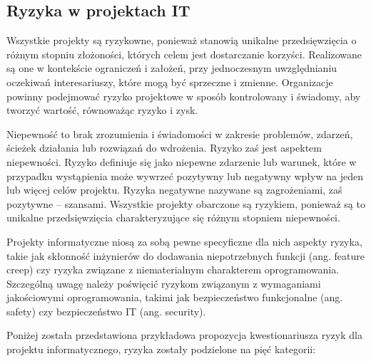 \subsection{Ryzyka w projektach IT}
Wszystkie projekty są ryzykowne, ponieważ stanowią unikalne przedsięwzięcia o różnym stopniu złożoności, których celem jest dostarczanie korzyści. Realizowane są one w kontekście ograniczeń i założeń, przy jednoczesnym uwzględnianiu oczekiwań interesariuszy, które mogą być sprzeczne i zmienne. Organizacje powinny podejmować ryzyko projektowe w sposób kontrolowany i świadomy, aby tworzyć wartość, równoważąc ryzyko i zysk. \autocite{pmbok6}

Niepewność to brak zrozumienia i świadomości w zakresie problemów, zdarzeń, ścieżek działania lub rozwiązań do wdrożenia. Ryzyko zaś jest aspektem niepewności. Ryzyko definiuje się jako niepewne zdarzenie lub warunek, które w przypadku wystąpienia może wywrzeć pozytywny lub negatywny wpływ na jeden lub więcej celów projektu. Ryzyka negatywne nazywane są zagrożeniami, zaś pozytywne – szansami. Wszystkie projekty obarczone są ryzykiem, ponieważ są to unikalne przedsięwzięcia charakteryzujące się różnym stopniem niepewności. \autocite{pmbok7}

Projekty informatyczne niosą za sobą pewne specyficzne dla nich aspekty ryzyka, takie jak skłonność inżynierów do dodawania niepotrzebnych funkcji (ang. feature creep) czy ryzyka związane z niematerialnym charakterem oprogramowania. Szczególną uwagę należy poświęcić ryzykom związanym z wymaganiami jakościowymi oprogramowania, takimi jak bezpieczeństwo funkcjonalne (ang. safety) czy bezpieczeństwo IT (ang. security). \autocite{program}\autocite{swebok}

Poniżej została przedstawiona przykładowa propozycja kwestionariusza ryzyk dla projektu informatycznego, ryzyka zostały podzielone na pięć kategorii: \autocite{ITPM}

